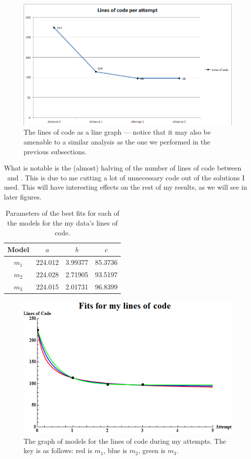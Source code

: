 \begin{figure}[ht!]
\centering
\includegraphics[scale=0.65]{./media/MyData_LOC.png}
\caption{The lines of code as a line graph --- notice that it may also be
  amenable to a similar analysis as the one we performed in the previous
    subsections.}
\label{figure:LOC}
\end{figure}

What is notable is the (almost) halving of the number of lines of code between
\AZ\ and \AO.
This is due to me cutting a lot of unnecessary code out of the solutions I used.
This will have interesting effects on the rest of my results, as we will see in
later figures.

\begin{table}[ht!]
\centering
\begin{tabular}{|c|c|c|c|}
\hline
{\bf Model} &  $a$ & $b$ & $c$ \\
\hline
$m_1$ & 224.012 & 3.99377 & 85.3736 \\
\hline
$m_2$ & 224.028 & 2.71905 & 93.5197\\
\hline
$m_3$ & 224.015 & 2.01731 & 96.8399 \\
\hline
\end{tabular}
\caption{Parameters of the best fits for each of the models for the my data's
  lines of code.}
\label{table:LOC:abc}
\end{table}

\begin{figure}[ht!]
\centering
\includegraphics[scale=0.65]{./media/LOCGraph.png}
\caption{The graph of models for the lines of code during my attempts. The key is as follows:
		 red is $m_1$,
		 blue is $m_2$,
		 green is $m_3$.
}
	\label{figure:LOC:abc}
\end{figure}

